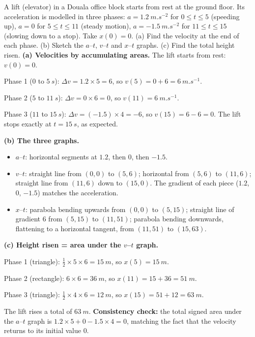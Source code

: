 \documentclass[11pt]{article}
\begin{document}
\begin{exoresolu}
A lift (elevator) in a Douala office block starts from rest at the ground floor. Its acceleration is modelled in three phases: $a = \SI{1.2}{m.s^{-2}}$ for $0 \le t \le 5$ (speeding up), $a = 0$ for $5 \le t \le 11$ (steady motion), $a = \SI{-1.5}{m.s^{-2}}$ for $11 \le t \le 15$ (slowing down to a stop). Take $x(0) = 0$. (a) Find the velocity at the end of each phase. (b) Sketch the $a$--$t$, $v$--$t$ and $x$--$t$ graphs. (c) Find the total height risen.
\tcblower
\textbf{(a) Velocities by accumulating areas.} The lift starts from rest: $v(0) = 0$.

Phase 1 ($0$ to $\SI{5}{s}$): $\Delta v = 1.2 \times 5 = 6$, so $v(5) = 0 + 6 = \SI{6}{m.s^{-1}}$.

Phase 2 ($5$ to $\SI{11}{s}$): $\Delta v = 0 \times 6 = 0$, so $v(11) = \SI{6}{m.s^{-1}}$.

Phase 3 ($11$ to $\SI{15}{s}$): $\Delta v = (-1.5) \times 4 = -6$, so $v(15) = 6 - 6 = 0$. The lift stops exactly at $t = \SI{15}{s}$, as expected.

\textbf{(b) The three graphs.}
\begin{itemize}
\item $a$--$t$: horizontal segments at $1.2$, then $0$, then $-1.5$.
\item $v$--$t$: straight line from $(0,0)$ to $(5,6)$; horizontal from $(5,6)$ to $(11,6)$; straight line from $(11,6)$ down to $(15,0)$. The gradient of each piece ($1.2$, $0$, $-1.5$) matches the acceleration.
\item $x$--$t$: parabola bending upwards from $(0,0)$ to $(5,15)$; straight line of gradient $6$ from $(5,15)$ to $(11,51)$; parabola bending downwards, flattening to a horizontal tangent, from $(11,51)$ to $(15,63)$.
\end{itemize}

\textbf{(c) Height risen = area under the $v$--$t$ graph.}

Phase 1 (triangle): $\tfrac12 \times 5 \times 6 = \SI{15}{m}$, so $x(5) = \SI{15}{m}$.

Phase 2 (rectangle): $6 \times 6 = \SI{36}{m}$, so $x(11) = 15 + 36 = \SI{51}{m}$.

Phase 3 (triangle): $\tfrac12 \times 4 \times 6 = \SI{12}{m}$, so $x(15) = 51 + 12 = \SI{63}{m}$.

The lift rises a total of $\SI{63}{m}$. \textbf{Consistency check:} the total signed area under the $a$--$t$ graph is $1.2\times5 + 0 - 1.5\times4 = 0$, matching the fact that the velocity returns to its initial value $0$.
\end{exoresolu}
\end{document}
